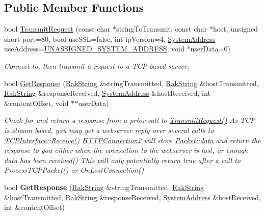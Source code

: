 \subsection*{Public Member Functions}
\begin{DoxyCompactItemize}
\item 
bool \hyperlink{class_rak_net_1_1_h_t_t_p_connection2_a04d73fc6491301a2c6110fba7731b70e}{Transmit\-Request} (const char $\ast$string\-To\-Transmit, const char $\ast$host, unsigned short port=80, bool use\-S\-S\-L=false, int ip\-Version=4, \hyperlink{struct_rak_net_1_1_system_address}{System\-Address} use\-Address=\hyperlink{namespace_rak_net_a80c95b4ed53f42911a6fa92b85e929cf}{U\-N\-A\-S\-S\-I\-G\-N\-E\-D\-\_\-\-S\-Y\-S\-T\-E\-M\-\_\-\-A\-D\-D\-R\-E\-S\-S}, void $\ast$user\-Data=0)
\begin{DoxyCompactList}\small\item\em Connect to, then transmit a request to a T\-C\-P based server. \end{DoxyCompactList}\item 
bool \hyperlink{class_rak_net_1_1_h_t_t_p_connection2_a5c8097c8724bde53b2747db7e95d34fa}{Get\-Response} (\hyperlink{class_rak_net_1_1_rak_string}{Rak\-String} \&string\-Transmitted, \hyperlink{class_rak_net_1_1_rak_string}{Rak\-String} \&host\-Transmitted, \hyperlink{class_rak_net_1_1_rak_string}{Rak\-String} \&response\-Received, \hyperlink{struct_rak_net_1_1_system_address}{System\-Address} \&host\-Received, int \&content\-Offset, void $\ast$$\ast$user\-Data)
\begin{DoxyCompactList}\small\item\em Check for and return a response from a prior call to \hyperlink{class_rak_net_1_1_h_t_t_p_connection2_a04d73fc6491301a2c6110fba7731b70e}{Transmit\-Request()} As T\-C\-P is stream based, you may get a webserver reply over several calls to \hyperlink{class_rak_net_1_1_t_c_p_interface_a4b08b6bfdbf4523be67360e3042a4470}{T\-C\-P\-Interface\-::\-Receive()} \hyperlink{class_rak_net_1_1_h_t_t_p_connection2}{H\-T\-T\-P\-Connection2} will store \hyperlink{struct_rak_net_1_1_packet_a63e46b85c8ca156b205a124e54659614}{Packet\-::data} and return the response to you either when the connection to the webserver is lost, or enough data has been received() This will only potentially return true after a call to Process\-T\-C\-P\-Packet() or On\-Lost\-Connection() \end{DoxyCompactList}\item 
\hypertarget{class_rak_net_1_1_h_t_t_p_connection2_aabd5ad8f5796a764047581ab6f48263c}{bool {\bfseries Get\-Response} (\hyperlink{class_rak_net_1_1_rak_string}{Rak\-String} \&string\-Transmitted, \hyperlink{class_rak_net_1_1_rak_string}{Rak\-String} \&host\-Transmitted, \hyperlink{class_rak_net_1_1_rak_string}{Rak\-String} \&response\-Received, \hyperlink{struct_rak_net_1_1_system_address}{System\-Address} \&host\-Received, int \&content\-Offset)}\label{class_rak_net_1_1_h_t_t_p_connection2_aabd5ad8f5796a764047581ab6f48263c}


\end{DoxyCompactItemize}
